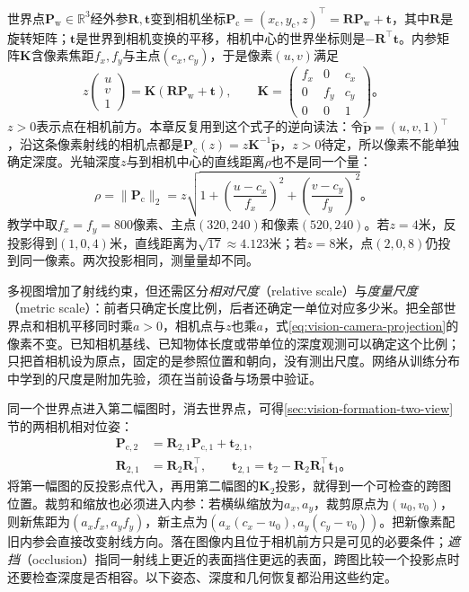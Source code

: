 世界点$\bm{P}_{\mathrm w}\in\mathbb{R}^3$经外参$\bm{R},\bm{t}$变到相机坐标$\bm{P}_{\mathrm c}=(x_{\mathrm c},y_{\mathrm c},z)^\top=\bm{R}\bm{P}_{\mathrm w}+\bm{t}$，其中$\bm{R}$是旋转矩阵；$\bm{t}$是世界到相机变换的平移，相机中心的世界坐标则是$-\bm{R}^{\top}\bm{t}$。内参矩阵$\bm{K}$含像素焦距$f_x,f_y$与主点$(c_x,c_y)$，于是像素$(u,v)$满足
\begin{equation}
 z\begin{pmatrix}u\\v\\1\end{pmatrix}
 =\bm{K}(\bm{R}\bm{P}_{\mathrm w}+\bm{t}),\qquad
 \bm{K}=\begin{pmatrix}f_x&0&c_x\\0&f_y&c_y\\0&0&1\end{pmatrix}\text{。}
 \label{eq:vision-camera-projection}
\end{equation}
$z>0$表示点在相机前方。本章反复用到这个式子的逆向读法：令$\tilde{\bm{p}}=(u,v,1)^\top$，沿这条像素射线的相机点都是$\bm{P}_{\mathrm c}(z)=z\bm{K}^{-1}\tilde{\bm{p}}$，$z>0$待定，所以像素不能单独确定深度。光轴深度$z$与到相机中心的直线距离$\rho$也不是同一个量：
\begin{equation}
 \rho=\lVert\bm{P}_{\mathrm c}\rVert_2
 =z\sqrt{1+\left(\frac{u-c_x}{f_x}\right)^2
            +\left(\frac{v-c_y}{f_y}\right)^2}\text{。}
 \label{eq:vision-depth-range-measurement}
\end{equation}
教学中取$f_x=f_y=800$像素、主点$(320,240)$和像素$(520,240)$。若$z=4$米，反投影得到$(1,0,4)$米，直线距离为$\sqrt{17}\approx4.123$米；若$z=8$米，点$(2,0,8)$仍投到同一像素。两次投影相同，测量量却不同。

多视图增加了射线约束，但还需区分\emph{相对尺度}（relative scale）与\emph{度量尺度}（metric scale）：前者只确定长度比例，后者还确定一单位对应多少米。把全部世界点和相机平移同时乘$a>0$，相机点与$z$也乘$a$，式\eqref{eq:vision-camera-projection}的像素不变。已知相机基线、已知物体长度或带单位的深度观测可以确定这个比例；只把首相机设为原点，固定的是参照位置和朝向，没有测出尺度。网络从训练分布中学到的尺度是附加先验，须在当前设备与场景中验证。

同一个世界点进入第二幅图时，消去世界点，可得\ref{sec:vision-formation-two-view}节的两相机相对位姿：
\begin{equation}
 \begin{aligned}
 \bm{P}_{\mathrm c,2}
 &=\bm{R}_{2,1}\bm{P}_{\mathrm c,1}+\bm{t}_{2,1},\\
 \bm{R}_{2,1}&=\bm{R}_2\bm{R}_1^\top,\qquad
 \bm{t}_{2,1}=\bm{t}_2-\bm{R}_2\bm{R}_1^\top\bm{t}_1\text{。}
 \end{aligned}
 \label{eq:vision-relative-camera-measurement}
\end{equation}
将第一幅图的反投影点代入，再用第二幅图的$\bm{K}_2$投影，就得到一个可检查的跨图位置。裁剪和缩放也必须进入内参：若横纵缩放为$a_x,a_y$，裁剪原点为$(u_0,v_0)$，则新焦距为$(a_xf_x,a_yf_y)$，新主点为$(a_x(c_x-u_0),a_y(c_y-v_0))$。把新像素配旧内参会直接改变射线方向。落在图像内且位于相机前方只是可见的必要条件；\emph{遮挡}（occlusion）指同一射线上更近的表面挡住更远的表面，跨图比较一个投影点时还要检查深度是否相容。以下姿态、深度和几何恢复都沿用这些约定。

